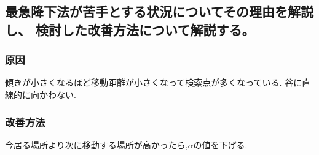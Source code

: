 \subsection{最急降下法が苦手とする状況についてその理由を解説し、
検討した改善方法について解説する。}
\subsubsection{原因}
傾きが小さくなるほど移動距離が小さくなって検索点が多くなっている.
谷に直線的に向かわない.
\subsubsection{改善方法}
今居る場所より次に移動する場所が高かったら,$\alpha$の値を下げる.
